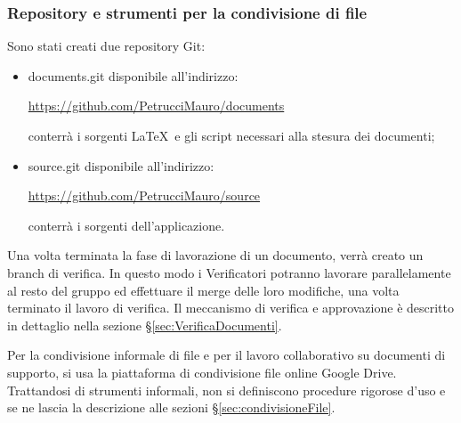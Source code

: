 \subsubsection{Repository e strumenti per la condivisione di file}

Sono stati creati due repository Git:
\begin{itemize}


\item documents.git disponibile all’indirizzo:\\
\begin{center}\url{https://github.com/PetrucciMauro/documents}\\\end{center}
conterrà i sorgenti \LaTeX \ e gli script necessari alla stesura dei documenti;
\item source.git disponibile all’indirizzo:\\
\begin{center}
\url{https://github.com/PetrucciMauro/source}\\
\end{center}
conterrà i sorgenti dell’applicazione.\\
\end{itemize}
Una volta terminata la fase di lavorazione di un documento, verrà creato un branch di verifica. In questo modo i Verificatori potranno lavorare parallelamente al resto del gruppo ed effettuare il merge  delle loro modifiche, una volta terminato il lavoro di verifica.
Il meccanismo di verifica e approvazione è descritto in dettaglio nella sezione \S\ref{sec:VerificaDocumenti}.


Per la condivisione informale di file e per il lavoro collaborativo su documenti di supporto, si usa la piattaforma di condivisione file online Google Drive.
Trattandosi di strumenti informali, non si definiscono procedure rigorose d’uso e se ne lascia la descrizione alle sezioni \S\ref{sec:condivisioneFile}.